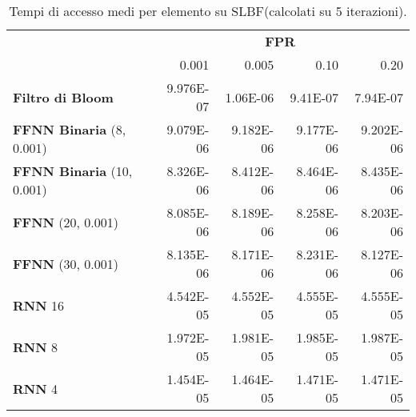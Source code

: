 \documentclass[4apaper,11pt]{report}
\begin{document}
    \begin{table}[H]
        \centering
        \begin{tabular}{lrrrr}
            \toprule
            & \multicolumn{4}{c}{\textbf{FPR}}\\
            & 0.001 & 0.005 & 0.10 & 0.20\\        
            \midrule
            \textbf{Filtro di Bloom} & 9.976E-07 & 1.06E-06 & 9.41E-07 & 7.94E-07\\
            \midrule
            \textbf{FFNN Binaria} (8, 0.001) & 9.079E-06 & 9.182E-06 &  9.177E-06 & 9.202E-06\\
            \textbf{FFNN Binaria} (10, 0.001) & 8.326E-06 & 8.412E-06 & 8.464E-06 & 8.435E-06\\
            \textbf{FFNN} (20, 0.001) & 8.085E-06 & 8.189E-06 &  8.258E-06 & 8.203E-06\\
            \textbf{FFNN} (30, 0.001) & 8.135E-06 & 8.171E-06 &  8.231E-06 & 8.127E-06\\
            \textbf{RNN} 16 & 4.542E-05 & 4.552E-05 &  4.555E-05 & 4.555E-05\\
            \textbf{RNN} 8 &  1.972E-05 & 1.981E-05 &  1.985E-05 & 1.987E-05\\
            \textbf{RNN} 4 & 1.454E-05 & 1.464E-05 & 1.471E-05 & 1.471E-05\\
            \bottomrule
        \end{tabular}
        \caption{Tempi di accesso medi per elemento su SLBF(calcolati su 5 iterazioni).}
    \end{table}
\end{document}
